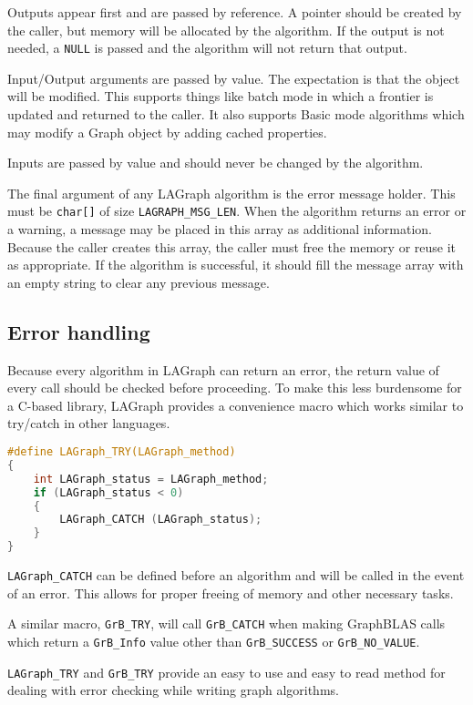Outputs appear first and are passed by reference. A pointer should be created by the caller, but
memory will be allocated by the algorithm. If the output is not needed, a \verb'NULL' is passed and the
algorithm will not return that output.

Input/Output arguments are passed by value. The expectation is that the object will be modified.
This supports things like batch mode in which a frontier is updated and returned to the caller.
It also supports Basic mode algorithms which may modify a Graph object by adding cached properties.

Inputs are passed by value and should never be changed by the algorithm.

The final argument of any LAGraph algorithm is the error message holder. This must be \verb'char[]' of
size \verb'LAGRAPH_MSG_LEN'. When the algorithm returns an error or a warning, a message may be placed in
this array as additional information. Because the caller creates this array, the caller must free
the memory or reuse it as appropriate. If the algorithm is successful, it should fill the message array
with an empty string to clear any previous message.


\subsection{Error handling}

Because every algorithm in LAGraph can return an error, the return value of every call should be
checked before proceeding. To make this less burdensome for a C-based library, LAGraph provides a
convenience macro which works similar to try/catch in other languages.

\begin{lstlisting}[language=C, label=lst:lagraphtrycatch, caption=Try/Catch LAGraph Utility]
#define LAGraph_TRY(LAGraph_method)
{
    int LAGraph_status = LAGraph_method;
    if (LAGraph_status < 0)
    {
        LAGraph_CATCH (LAGraph_status);
    }
}
\end{lstlisting}


\verb'LAGraph_CATCH' can be defined before an algorithm and will be called in the event of an error.
This allows for proper freeing of memory and other necessary tasks.

A similar macro, \verb'GrB_TRY', will call \verb'GrB_CATCH' when making GraphBLAS calls which return
a \verb'GrB_Info' value other than \verb'GrB_SUCCESS' or \verb'GrB_NO_VALUE'.

\verb'LAGraph_TRY' and \verb'GrB_TRY' provide an easy to use and easy to read method for dealing with
error checking while writing graph algorithms.



